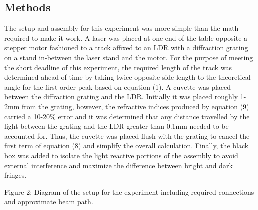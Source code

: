 \documentclass[11pt]{article}
\begin{document}
    \hypertarget{methods}{%
\subsection{Methods}\label{methods}}

    The setup and assembly for this experiment was more simple than the math
required to make it work. A laser was placed at one end of the table
opposite a stepper motor fashioned to a track affixed to an LDR with a
diffraction grating on a stand in-between the laser stand and the motor.
For the purpose of meeting the short deadline of this experiment, the
required length of the track was determined ahead of time by taking
twice opposite side length to the theoretical angle for the first order
peak based on equation (1). A cuvette was placed between the diffraction
grating and the LDR. Initially it was placed roughly 1-2mm from the
grating, however, the refractive indices produced by equation (9)
carried a 10-20\% error and it was determined that any distance
travelled by the light between the grating and the LDR greater than
0.1mm needed to be accounted for. Thus, the cuvette was placed flush
with the grating to cancel the first term of equation (8) and simplify
the overall calculation. Finally, the black box was added to isolate the
light reactive portions of the assembly to avoid external interference
and maximize the difference between bright and dark fringes.

    Figure 2: Diagram of the setup for the experiment including required
connections and approximate beam path.
\end{document}
